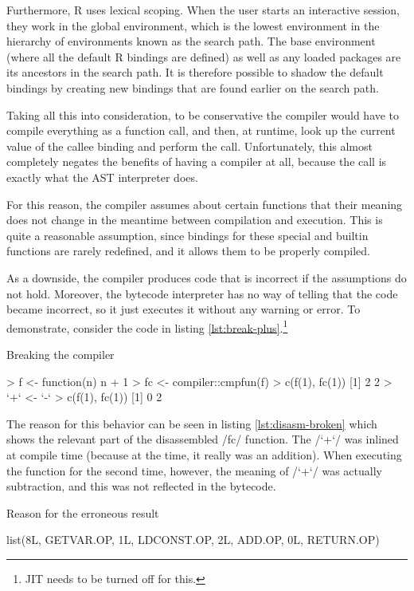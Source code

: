 {Furthermore, R uses lexical scoping. When the user starts an interactive session, they work in the global environment, which is the lowest environment in the hierarchy of environments known as the search path. The base environment (where all the default R bindings are defined) as well as any loaded packages are its ancestors in the search path. It is therefore possible to shadow the default bindings by creating new bindings that are found earlier on the search path.

Taking all this into consideration, to be conservative the compiler would have to compile everything as a function call, and then, at runtime, look up the current value of the callee binding and perform the call. Unfortunately, this almost completely negates the benefits of having a compiler at all, because the call is exactly what the AST interpreter does.

For this reason, the compiler assumes about certain functions that their meaning does not change in the meantime between compilation and execution. This is quite a reasonable assumption, since bindings for these special and builtin functions are rarely redefined, and it allows them to be properly compiled.

As a downside, the compiler produces code that is incorrect if the assumptions do not hold. Moreover, the bytecode interpreter has no way of telling that the code became incorrect, so it just executes it without any warning or error. To demonstrate, consider the code in listing \ref{lst:break-plus}.\footnote{JIT needs to be turned off for this.}

\begin{listing}[htbp]
  \caption{\label{lst:break-plus}Breaking the compiler}
  \begin{rcode}
> f <- function(n) n + 1
> fc <- compiler::cmpfun(f)
> c(f(1), fc(1))
[1] 2 2
> `+` <- `-`
> c(f(1), fc(1))
[1] 0 2
  \end{rcode}
\end{listing}

The reason for this behavior can be seen in listing \ref{lst:disasm-broken} which shows the relevant part of the disassembled \rinline/fc/ function. The \rinline/`+`/ was inlined at compile time (because at the time, it really was an addition). When executing the function for the second time, however, the meaning of \rinline/`+`/ was actually subtraction, and this was not reflected in the bytecode.

\begin{listing}[htbp]
  \caption{\label{lst:disasm-broken}Reason for the erroneous result}
  \begin{rcode}
list(8L,
     GETVAR.OP, 1L,
     LDCONST.OP, 2L,
     ADD.OP, 0L,
     RETURN.OP)
  \end{rcode}
\end{listing}

}
